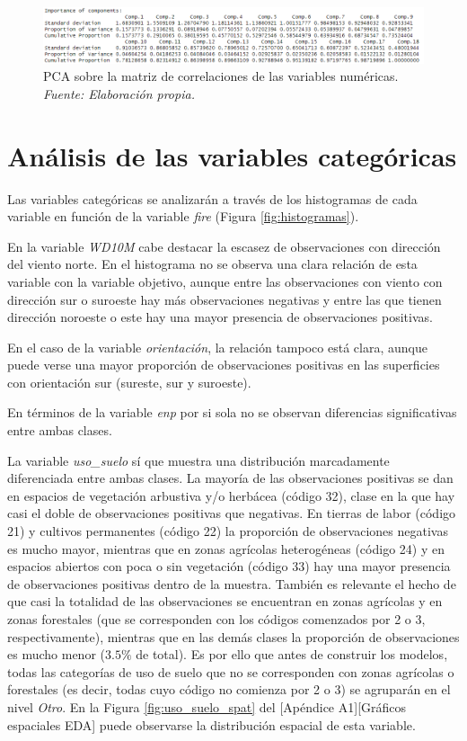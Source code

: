 \documentclass[12pt,a4paper,]{book}
\numberwithin{dummy}{section}
\theoremstyle{ocrenumbox}
\theoremstyle{blacknumex}
\theoremstyle{blacknumbox}
\theoremstyle{ocrenum}
\theoremstyle{ocrenum}
\begin{document}
\begin{figure}[h]
\centering
\includegraphics[width =\textwidth]{graficos/pca.png}
\caption[PCA sobre la matriz de correlaciones de las variables numéricas]{PCA sobre la matriz de correlaciones de las variables numéricas. \it Fuente: Elaboración propia.}
\label{fig:PCA}
\end{figure}

\hypertarget{anuxe1lisis-de-las-variables-categuxf3ricas}{%
\section{Análisis de las variables
categóricas}\label{anuxe1lisis-de-las-variables-categuxf3ricas}}

Las variables categóricas se analizarán a través de los histogramas de
cada variable en función de la variable \emph{fire} (Figura
\ref{fig:histogramas}).

En la variable \emph{WD10M} cabe destacar la escasez de observaciones
con dirección del viento norte. En el histograma no se observa una clara
relación de esta variable con la variable objetivo, aunque entre las
observaciones con viento con dirección sur o suroeste hay más
observaciones negativas y entre las que tienen dirección noroeste o este
hay una mayor presencia de observaciones positivas.

En el caso de la variable \emph{orientación}, la relación tampoco está
clara, aunque puede verse una mayor proporción de observaciones
positivas en las superficies con orientación sur (sureste, sur y
suroeste).

En términos de la variable \emph{enp} por si sola no se observan
diferencias significativas entre ambas clases.

La variable \emph{uso\_suelo} sí que muestra una distribución
marcadamente diferenciada entre ambas clases. La mayoría de las
observaciones positivas se dan en espacios de vegetación arbustiva y/o
herbácea (código 32), clase en la que hay casi el doble de observaciones
positivas que negativas. En tierras de labor (código 21) y cultivos
permanentes (código 22) la proporción de observaciones negativas es
mucho mayor, mientras que en zonas agrícolas heterogéneas (código 24) y
en espacios abiertos con poca o sin vegetación (código 33) hay una mayor
presencia de observaciones positivas dentro de la muestra. También es
relevante el hecho de que casi la totalidad de las observaciones se
encuentran en zonas agrícolas y en zonas forestales (que se corresponden
con los códigos comenzados por 2 o 3, respectivamente), mientras que en
las demás clases la proporción de observaciones es mucho menor
(\(3.5\%\) de total). Es por ello que antes de construir los modelos,
todas las categorías de uso de suelo que no se corresponden con zonas
agrícolas o forestales (es decir, todas cuyo código no comienza por 2 o
3) se agruparán en el nivel \emph{Otro}. En la Figura
\ref{fig:uso_suelo_spat} del {[}Apéndice A1{]}{[}Gráficos espaciales
EDA{]} puede observarse la distribución espacial de esta variable.
\end{document}
